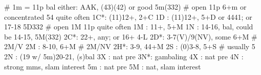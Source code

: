 # 1m = 11p bal either: AAK, (43)(42) or good 5m(332)
# open 11p 6+m or concentrated 54 quite often
1C*: (11)12+, 2+C
1D : (11)12+, 5+D or 4441; or 17-18 5D332
# open 1M 11p quite often
1M : 11+, 5+M
1N : 14-16, bal, could be 14-15, 5M(332)
2C*: 22+, any; or 16+ 4-L
2D*: 3-7(V)/9(NV), some 6+M
# 2M/V
2M : 8-10, 6+M
# 2M/NV
2H*: 3-9, 44+M
2S : (0)3-8, 5+S  # usually 5
2N : (19 w/ 5m)20-21, (s)bal
3X : nat pre
3N*: gambaling
4X : nat pre
4N : strong mms, slam interest
5m : nat pre
5M : nat, slam interest
